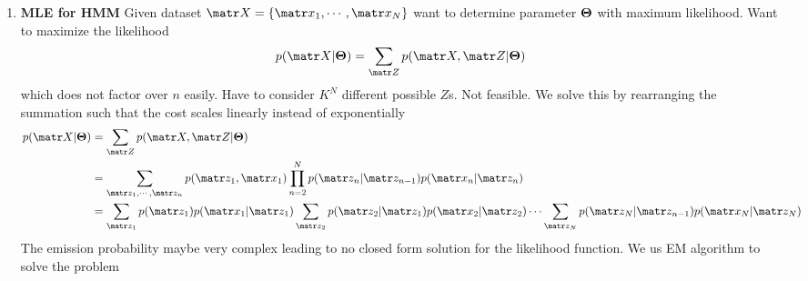 \documentclass[11pt]{article}
\begin{document}
\begin{defn*}
\begin{enumerate}
\begin{enumerate}
        \end{enumerate}
        \item \textbf{MLE for HMM} Given dataset $\bX = \{\bx_1, \cdots, \bx_N\}$ want to determine parameter $\boldsymbol{\Theta}$ with maximum likelihood. Want to maximize the likelihood
        \[
            p(\bX | \bTheta) = \sum_{\bZ} p(\bX, \bZ | \bTheta)    
        \]
        which does not factor over $n$ easily. Have to consider $K^N$ different possible $Z$s. Not feasible. We solve this by rearranging the summation such that the cost scales linearly instead of exponentially 
        \begin{align*}
            p(\bX | \bTheta)
            &= \sum_{\bZ} p(\bX, \bZ | \bTheta) \\ 
            &= \sum_{\bz_1, \cdots, \bz_n} p(\bz_1, \bx_1) \prod_{n=2}^N p(\bz_n | \bz_{n-1}) p(\bx_n | \bz_n)  \\ 
            &= \sum_{\bz_1} p(\bz_1) p(\bx_1 | \bz_1) \sum_{\bz_2} p(\bz_2 |\bz_1) p(\bx_2 | \bz_2) \cdots \sum_{\bz_N} p(\bz_{N} | \bz_{n-1}) p(\bx_N | \bz_N)
        \end{align*}
        The emission probability maybe very complex leading to no closed form solution for the likelihood function. We us EM algorithm to solve the problem
    \end{enumerate}
\end{defn*}
\end{document}
